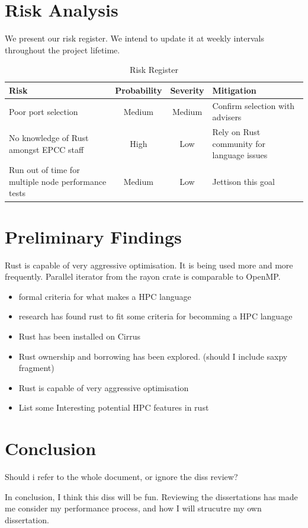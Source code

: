 \documentclass{report}
\begin{document}
\chapter{Risk Analysis}
We present our risk register. We intend to update it at weekly intervals throughout the project lifetime.
\begin{table}[h]
  \centering
  \begin{tabular}{p{4cm} c c p{4cm}}
    Risk & Probability & Severity & Mitigation \\
    \hline
    Poor port selection & Medium & Medium & Confirm selection with advisers \\ \hline
    No knowledge of Rust amongst EPCC staff & High & Low & Rely on Rust community for language issues \\
    \hline
    Run out of time for multiple node performance tests & Medium & Low & Jettison this goal
    \end{tabular}
  \caption{Risk Register}
  \label{tab:risk}
\end{table}
\chapter{Preliminary Findings}
Rust is capable of very aggressive optimisation. It is being used more and more frequently. Parallel iterator from the rayon crate is comparable to OpenMP.

\begin{itemize}
  \item formal criteria for what makes a HPC language
  \item research has found rust to fit some criteria for becomming a HPC language
  \item Rust has been installed on Cirrus
  \item Rust ownership and borrowing has been explored. (should I include saxpy fragment)
  \item Rust is capable of very aggressive optimisation
  \item List some Interesting potential HPC features in rust
\end{itemize}


\chapter{Conclusion}
Should i refer to the whole document, or ignore the diss review?

In conclusion, I think this diss will be fun. Reviewing the dissertations has made me consider my performance process, and how I will strucutre my own dissertation.
\pagebreak


\end{document}
